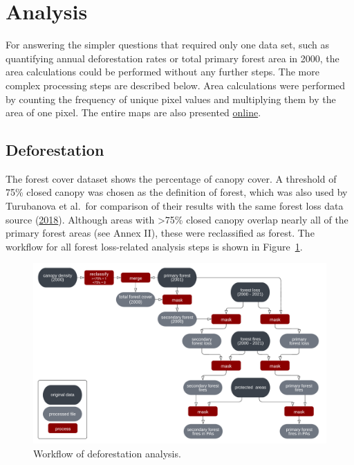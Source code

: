 \documentclass[
  letterpaper,
  DIV=11,
  numbers=noendperiod]{scrreprt}
\begin{document}
\hypertarget{analysis}{%
\section{Analysis}\label{analysis}}

For answering the simpler questions that required only one data set,
such as quantifying annual deforestation rates or total primary forest
area in 2000, the area calculations could be performed without any
further steps. The more complex processing steps are described below.
Area calculations were performed by counting the frequency of unique
pixel values and multiplying them by the area of one pixel. The entire
maps are also presented
\href{https://storymaps.arcgis.com/stories/4594866b4f414b8aa7571325336db771}{online}.

\hypertarget{deforestation}{%
\subsection{Deforestation}\label{deforestation}}

The forest cover dataset shows the percentage of canopy cover. A
threshold of 75\% closed canopy was chosen as the definition of forest,
which was also used by Turubanova et al.~for comparison of their results
with the same forest loss data source
(\protect\hyperlink{ref-turubanovaOngoingPrimaryForest2018}{2018}).
Although areas with \textgreater75\% closed canopy overlap nearly all of
the primary forest areas (see Annex II), these were reclassified as
forest. The workflow for all forest loss-related analysis steps is shown
in Figure~\ref{fig-wf_deforestation}.

\begin{figure}[H]

{\centering \includegraphics{text/05_method_files/wf_deforestation.png}

}

\caption{\label{fig-wf_deforestation}Workflow of deforestation
analysis.}

\end{figure}
\end{document}
